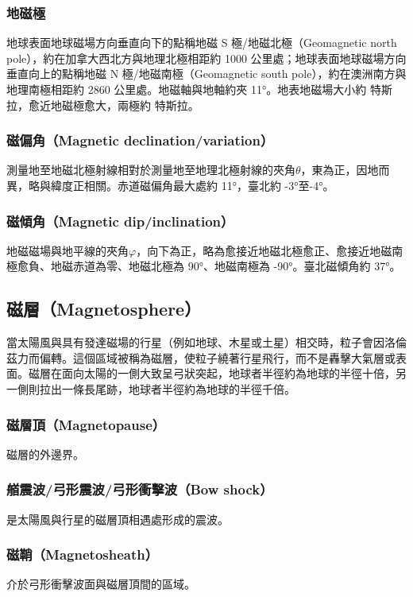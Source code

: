\documentclass[a4paper,12pt]{report}
\begin{document}
\begin{itemize}
\subsubsection{地磁極}
地球表面地球磁場方向垂直向下的點稱地磁 S 極/地磁北極（Geomagnetic north pole），約在加拿大西北方與地理北極相距約 1000 公里處；地球表面地球磁場方向垂直向上的點稱地磁 N 極/地磁南極（Geomagnetic south pole），約在澳洲南方與地理南極相距約 2860 公里處。地磁軸與地軸約夾 11°。地表地磁場大小約  特斯拉，愈近地磁極愈大，兩極約  特斯拉。
\subsubsection{磁偏角（Magnetic declination/variation）}
測量地至地磁北極射線相對於測量地至地理北極射線的夾角$\theta$，東為正，因地而異，略與緯度正相關。赤道磁偏角最大處約 11°，臺北約 -3°至-4°。
\subsubsection{磁傾角（Magnetic dip/inclination） }
地磁磁場與地平線的夾角$\varphi$，向下為正，略為愈接近地磁北極愈正、愈接近地磁南極愈負、地磁赤道為零、地磁北極為 90°、地磁南極為 -90°。臺北磁傾角約 37°。
\subsection{磁層（Magnetosphere）}
當太陽風與具有發達磁場的行星（例如地球、木星或土星）相交時，粒子會因洛倫茲力而偏轉。這個區域被稱為磁層，使粒子繞著行星飛行，而不是轟擊大氣層或表面。磁層在面向太陽的一側大致呈弓狀突起，地球者半徑約為地球的半徑十倍，另一側則拉出一條長尾跡，地球者半徑約為地球的半徑千倍。
\subsubsection{磁層頂（Magnetopause）}
磁層的外邊界。
\subsubsection{艏震波/弓形震波/弓形衝擊波（Bow shock）}
是太陽風與行星的磁層頂相遇處形成的震波。
\subsubsection{磁鞘（Magnetosheath）}
介於弓形衝擊波面與磁層頂間的區域。

\end{itemize}
\end{document}
